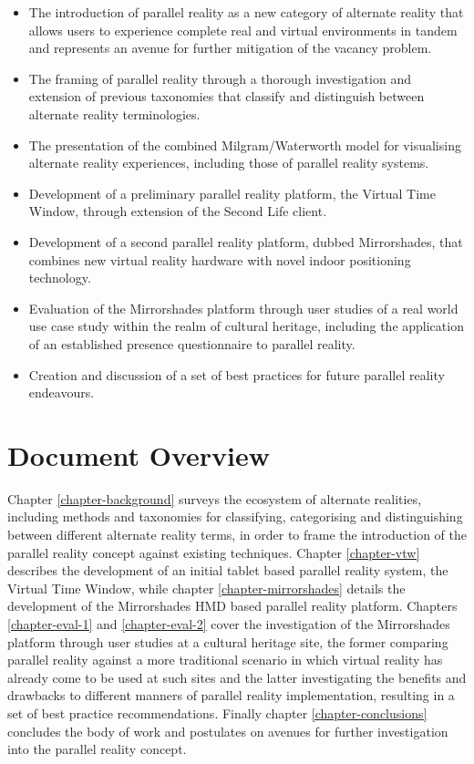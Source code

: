 \begin{itemize}
	\item The introduction of parallel reality as a new category of alternate reality that allows users to experience complete real and virtual environments in tandem and represents an avenue for further mitigation of the vacancy problem.
	\item The framing of parallel reality through a thorough investigation and extension of previous taxonomies that classify and distinguish between alternate reality terminologies.
	\item The presentation of the combined Milgram/Waterworth model for visualising alternate reality experiences, including those of parallel reality systems.
	\item Development of a preliminary parallel reality platform, the Virtual Time Window, through extension of the Second Life client.
	\item Development of a second parallel reality platform, dubbed Mirrorshades, that combines new virtual reality hardware with novel indoor positioning technology.
	\item Evaluation of the Mirrorshades platform through user studies of a real world use case study within the realm of cultural heritage, including the application of an established presence questionnaire to parallel reality.
	\item Creation and discussion of a set of best practices for future parallel reality endeavours.
\end{itemize}


\section{Document Overview}

Chapter \ref{chapter-background} surveys the ecosystem of alternate realities, including methods and taxonomies for classifying, categorising and distinguishing between different alternate reality terms, in order to frame the introduction of the parallel reality concept against existing techniques. Chapter \ref{chapter-vtw} describes the development of an initial tablet based parallel reality system, the Virtual Time Window, while chapter \ref{chapter-mirrorshades} details the development of the Mirrorshades HMD based parallel reality platform. Chapters \ref{chapter-eval-1} and \ref{chapter-eval-2} cover the investigation of the Mirrorshades platform through user studies at a cultural heritage site, the former comparing parallel reality against a more traditional scenario in which virtual reality has already come to be used at such sites and the latter investigating the benefits and drawbacks to different manners of parallel reality implementation, resulting in a set of best practice recommendations. Finally chapter \ref{chapter-conclusions} concludes the body of work and postulates on avenues for further investigation into the parallel reality concept.

